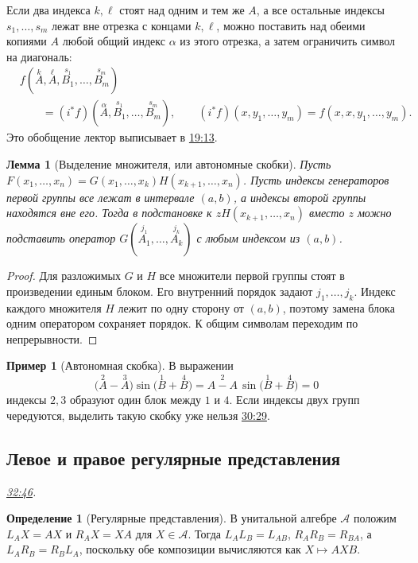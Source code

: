 \documentclass[11pt,a4paper]{article}
\theoremstyle{plain}
\newtheorem{lemma}[theorem]{Лемма}
\theoremstyle{definition}
\newtheorem{definition}[theorem]{Определение}
\newtheorem{example}[theorem]{Пример}
\newcommand{\at}[3]{\href{https://www.youtube.com/watch?v=#1&t=#2s}{#3}}
\newcommand{\topic}[2]{\Needspace{5\baselineskip}\subsection*{#1}\noindent\emph{#2.}\par\nobreak\smallskip}
\begin{document}
Если два индекса $k,\ell$ стоят над одним и тем же
$A$, а все остальные индексы $s_1,\ldots,s_m$ лежат
вне отрезка с концами $k,\ell$, можно поставить над
обеими копиями $A$ любой общий индекс $\alpha$ из
этого отрезка, а затем ограничить символ на диагональ:
\[
 \begin{aligned}
 &f(\overset{k}{A},\overset{\ell}{A},
       \overset{s_1}{B_1},\ldots,\overset{s_m}{B_m})\\
 &\qquad=(i^*f)(\overset{\alpha}{A},
       \overset{s_1}{B_1},\ldots,\overset{s_m}{B_m}),
 \qquad (i^*f)(x,y_1,\ldots,y_m)=f(x,x,y_1,\ldots,y_m).
 \end{aligned}
\]
Это обобщение лектор выписывает в
\at{8kQuUxC-VVg}{1153}{19:13}.

\begin{lemma}[Выделение множителя, или автономные скобки]
Пусть
$F(x_1,\ldots,x_n)=G(x_1,\ldots,x_k)H(x_{k+1},\ldots,x_n)$.
Пусть индексы генераторов первой группы все лежат в
интервале $(a,b)$, а индексы второй группы находятся вне
его. Тогда в подстановке к $zH(x_{k+1},\ldots,x_n)$
вместо $z$ можно подставить оператор
$G(\overset{j_1}{A_1},\ldots,\overset{j_k}{A_k})$
с любым индексом из $(a,b)$.
\end{lemma}
\begin{proof}
Для разложимых $G$ и $H$ все множители первой группы
стоят в произведении единым блоком. Его внутренний
порядок задают $j_1,\ldots,j_k$. Индекс каждого множителя
$H$ лежит по одну сторону от $(a,b)$, поэтому замена
блока одним оператором сохраняет порядок. К общим
символам переходим по непрерывности.
\end{proof}

\begin{example}[Автономная скобка]
В выражении
\[
 \bigl(\overset{2}{A}-\overset{3}{A}\bigr)
       \sin\bigl(\overset{1}{B}+\overset{4}{B}\bigr)
 =\overset{2}{\boxed{A-A}}\,
       \sin\bigl(\overset{1}{B}+\overset{4}{B}\bigr)=0
\]
индексы $2,3$ образуют один блок между $1$ и $4$.
Если индексы двух групп чередуются, выделить такую
скобку уже нельзя \at{8kQuUxC-VVg}{1829}{30:29}.
\end{example}

\topic{Левое и правое регулярные представления}{\at{8kQuUxC-VVg}{1966}{32:46}}
\begin{definition}[Регулярные представления]
В унитальной алгебре $\mathcal A$ положим
$L_A X=AX$ и $R_A X=XA$ для $X\in\mathcal A$.
Тогда $L_A L_B=L_{AB}$, $R_AR_B=R_{BA}$, а
$L_AR_B=R_BL_A$, поскольку обе композиции
вычисляются как $X\mapsto AXB$.
\end{definition}
\end{document}
